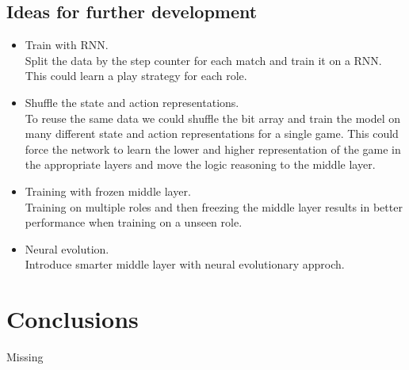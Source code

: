 \documentclass[twocolumn, letterpaper, 10 pt, conference]{ieeeconf}  %
\begin{document}
    \subsection{Ideas for further development}
    \begin{itemize}
        \item Train with RNN.\\
            Split the data by the step counter for each match and train it on a RNN. This could learn a play strategy for each role.
        \item Shuffle the state and action representations.\\
            To reuse the same data we could shuffle the bit array and train the model on many different state and action representations for a single game. This could force the network to learn the lower and higher representation of the game in the appropriate layers and move the logic reasoning to the middle layer. 
        \item Training with frozen middle layer. \\
            Training on multiple roles and then freezing the middle layer results in better performance when training on a unseen role.
        \item Neural evolution.\\
            Introduce smarter middle layer with neural evolutionary approch.
    \end{itemize}
    
  

\section{Conclusions}
\color{red}
    Missing
\color{black}






\newpage
\appendix
\end{document}
